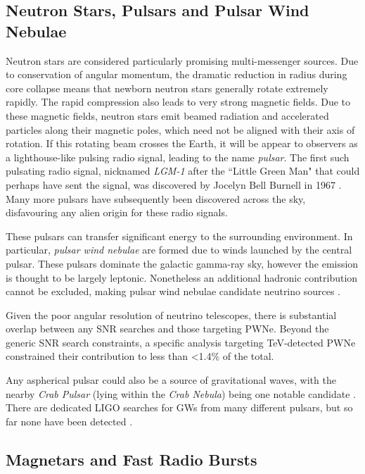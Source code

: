 \subsection*{Neutron Stars, Pulsars and Pulsar Wind Nebulae}

Neutron stars are considered particularly promising multi-messenger sources. Due to conservation of angular momentum, the dramatic reduction in radius during core collapse means that newborn neutron stars generally rotate extremely rapidly. The rapid compression also leads to very strong magnetic fields. Due to these magnetic fields, neutron stars emit beamed radiation and accelerated particles along their magnetic poles, which need not be aligned with their axis of rotation. If this rotating beam crosses the Earth, it will be appear to observers as a lighthouse-like pulsing radio signal, leading to the name \emph{pulsar}. The first such pulsating radio signal, nicknamed \emph{LGM-1} after the ``Little Green Man" that could perhaps have sent the signal, was discovered by Jocelyn Bell Burnell in 1967 . Many more pulsars have subsequently been discovered across the sky, disfavouring any alien origin for these radio signals.

These pulsars can transfer significant energy to the surrounding environment. In particular, \emph{pulsar wind nebulae} are formed due to winds launched by the central pulsar. These pulsars dominate the galactic gamma-ray sky, however the emission is thought to be largely leptonic. Nonetheless an additional hadronic contribution cannot be excluded, making pulsar wind nebulae candidate neutrino sources .

Given the poor angular resolution of neutrino telescopes, there is substantial overlap between any SNR searches and those targeting PWNe. Beyond the generic SNR search constraints, a specific analysis targeting TeV-detected PWNe  constrained their contribution to less than <1.4\% of the total. 

Any aspherical pulsar could also be a source of gravitational waves, with 
the nearby \emph{Crab Pulsar} (lying within the \emph{Crab Nebula}) being one notable candidate . There are dedicated LIGO searches for GWs from many different pulsars, but so far none have been detected .

\subsection*{Magnetars and Fast Radio Bursts}
\label{sec:frb}

